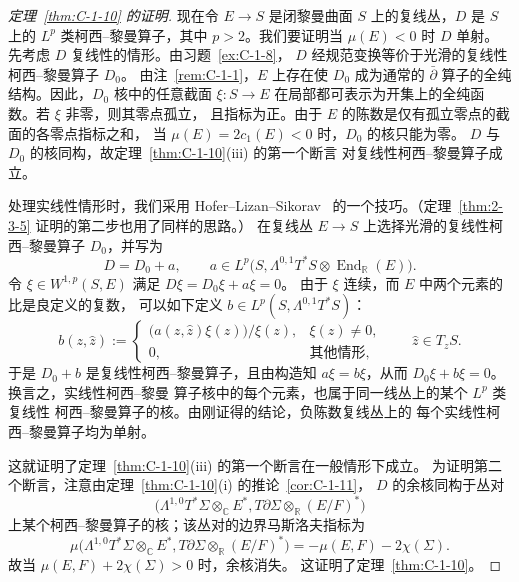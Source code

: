 \begin{proof}[定理~\ref{thm:C-1-10} 的证明]
现在令 $E\to S$ 是闭黎曼曲面 $S$ 上的复线丛，$D$ 是 $S$ 上的
$L^p$ 类柯西--黎曼算子，其中 $p>2$。我们要证明当 $\mu(E)<0$ 时
$D$ 单射。先考虑 $D$ 复线性的情形。由习题~\ref{ex:C-1-8}，
$D$ 经规范变换等价于光滑的复线性柯西--黎曼算子 $D_0$。
由注~\ref{rem:C-1-1}，$E$ 上存在使 $D_0$ 成为通常的 $\bar\partial$
算子的全纯结构。因此，$D_0$ 核中的任意截面 $\xi:S\to E$
在局部都可表示为开集上的全纯函数。若 $\xi$ 非零，则其零点孤立，
且指标为正。由于 $E$ 的陈数是仅有孤立零点的截面的各零点指标之和，
当 $\mu(E)=2c_1(E)<0$ 时，$D_0$ 的核只能为零。
$D$ 与 $D_0$ 的核同构，故定理~\ref{thm:C-1-10}(iii) 的第一个断言
对复线性柯西--黎曼算子成立。

处理实线性情形时，我们采用 Hofer--Lizan--Sikorav~
的一个技巧。（定理~\ref{thm:2-3-5} 证明的第二步也用了同样的思路。）
在复线丛 $E\to S$ 上选择光滑的复线性柯西--黎曼算子 $D_0$，并写为
\[
  D=D_0+a,\qquad
  a\in L^p\bigl(S,\Lambda^{0,1}T^*S
       \otimes\operatorname{End}_{\mathbb R}(E)\bigr).
\]
令 $\xi\in W^{1,p}(S,E)$ 满足 $D\xi=D_0\xi+a\xi=0$。
由于 $\xi$ 连续，而 $E$ 中两个元素的比是良定义的复数，
可以如下定义 $b\in L^p(S,\Lambda^{0,1}T^*S)$：
\[
  b(z,\widehat z):=
  \begin{cases}
    \bigl(a(z,\widehat z)\xi(z)\bigr)/\xi(z),&\xi(z)\ne0,\\
    0,&\text{其他情形},
  \end{cases}
  \qquad \widehat z\in T_zS.
\]
于是 $D_0+b$ 是复线性柯西--黎曼算子，且由构造知
$a\xi=b\xi$，从而 $D_0\xi+b\xi=0$。换言之，实线性柯西--黎曼
算子核中的每个元素，也属于同一线丛上的某个 $L^p$ 类复线性
柯西--黎曼算子的核。由刚证得的结论，负陈数复线丛上的
每个实线性柯西--黎曼算子均为单射。

这就证明了定理~\ref{thm:C-1-10}(iii) 的第一个断言在一般情形下成立。
为证明第二个断言，注意由定理~\ref{thm:C-1-10}(i) 的推论~\ref{cor:C-1-11}，
$D$ 的余核同构于丛对
\[
  \bigl(\Lambda^{1,0}T^*\Sigma\otimes_{\mathbb C}E^*,
       T\partial\Sigma\otimes_{\mathbb R}(E/F)^*\bigr)
\]
上某个柯西--黎曼算子的核；该丛对的边界马斯洛夫指标为
\[
  \mu\bigl(\Lambda^{1,0}T^*\Sigma\otimes_{\mathbb C}E^*,
       T\partial\Sigma\otimes_{\mathbb R}(E/F)^*\bigr)
  =-\mu(E,F)-2\chi(\Sigma).
\]
故当 $\mu(E,F)+2\chi(\Sigma)>0$ 时，余核消失。
这证明了定理~\ref{thm:C-1-10}。
\end{proof}

